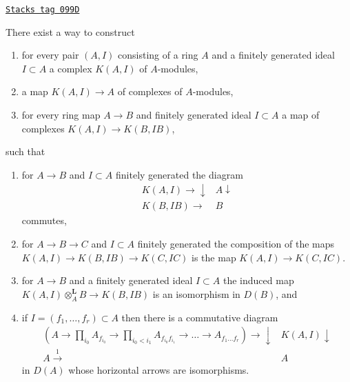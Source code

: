 \begin{lemma}
\label{algebraization-lemma-all-rings}
\href{https://stacks.math.columbia.edu/tag/099D}{\texttt{Stacks tag 099D}}

There exist a way to construct
\begin{enumerate}
\item for every pair $(A, I)$ consisting of a ring $A$ and a finitely
generated ideal $I \subset A$ a complex $K(A, I)$ of $A$-modules,
\item a map $K(A, I) \to A$ of complexes of $A$-modules,
\item for every ring map $A \to B$ and finitely generated ideal $I \subset A$
a map of complexes $K(A, I) \to K(B, IB)$,
\end{enumerate}
such that
\begin{enumerate}
\item[(a)] for $A \to B$ and $I \subset A$ finitely generated the diagram
$$
\begin{array}{cc}K(A, I) \longrightarrow\downarrow & A \downarrow \\ K(B, IB) \longrightarrow & B\end{array}
$$
commutes,
\item[(b)] for $A \to B \to C$ and $I \subset A$ finitely generated
the composition of the maps
$K(A, I) \to K(B, IB) \to K(C, IC)$ is the map $K(A, I) \to K(C, IC)$.
\item[(c)] for $A \to B$ and a finitely generated ideal $I \subset A$
the induced map $K(A, I) \otimes_A^\mathbf{L} B \to K(B, IB)$
is an isomorphism in $D(B)$, and
\item[(d)] if $I = (f_1, \ldots, f_r) \subset A$ then there is a commutative
diagram
$$
\begin{array}{cc}(A \to \prod\nolimits_{i_0} A_{f_{i_0}} \to
\prod\nolimits_{i_0 < i_1} A_{f_{i_0}f_{i_1}} \to
\ldots \to A_{f_1\ldots f_r}) \longrightarrow\downarrow & K(A, I) \downarrow \\ A \overset{1}{\longrightarrow} & A\end{array}
$$
in $D(A)$ whose horizontal arrows are isomorphisms.
\end{enumerate}
\end{lemma}

